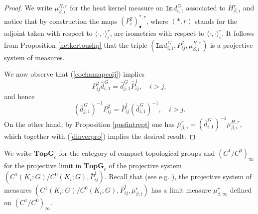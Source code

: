 \documentclass[11pt,reqno]{amsart}
\numberwithin{equation}{section}
\theoremstyle{remark}
\theoremstyle{rmdefinition}
\begin{document}
\begin{proof}
We write $\mu^{H,r}_{\beta,i}$ for the heat kernel measure on $\mathtt{Im}\hspace{1pt}d_{i,1}^{\hspace{1pt}G}$ associated to $H^r_{\beta,i}$ and notice that by construction the maps $(P^2_i)_{\bullet}^{*,r}$, where $(*,r)$ stands for the adjoint taken with respect to $\langle \cdot, \cdot \rangle_{i}^r$,  are isometries with respect to $\langle \cdot, \cdot \rangle_{i}^r$. It follows from Proposition \ref{hetkertoushp} that the triple $(\mathtt{Im}\hspace{1pt}d_{i,1}^{\hspace{1pt}G},P^2_{ij},\mu^{H,r}_{\beta,i})$ is a projective system of measures.

We now observe that (\ref{cochamapcoij}) implies
$$ P^{2}_{ij}\bar{d}^{\hspace{1pt}G}_{i,1} =\bar{d}^{\hspace{1pt}G}_{j,1} \hat{P}^1_{ij}, \quad i>j,$$
and hence
\begin{equation}\label{dinverpro}
(\bar{d}^{\hspace{1pt}G}_{j,1})^{-1}P^{2}_{ij}= \bar{P}^1_{ij} (\bar{d}^{\hspace{1pt}G}_{i,1})^{-1}, \quad i>j.
\end{equation}
On the other hand, by Proposition \ref{pusfintrept} one has $\bar{\mu}^r_{\beta,i}= (\bar{d}^{\hspace{1pt}G}_{i,1})^{-1}\mu^{H,r}_{\beta,i}$, which together with (\ref{dinverpro}) implies the desired result. 
\end{proof}

We write $\mathbf{TopG}_c$ for the category of compact topological groups and $(C^1/C^0)_\infty$ for the projective limit in $\mathbf{TopG}_c$  of the projective system \newline $(C^1(K_i;G)/C^0(K_i;G),\bar{P}^1_{ij})$. Recall that (see e.g. \cite[Part I, Chapter I, \S 10]{Sz}), the projective system of measures $(C^1(K_i;G)/C^0(K_i;G),\bar{P}^1_{ij},\bar{\mu}^r_{\beta,i})$ has a limit measure $\mu^r_{\beta,\infty}$ defined on $(C^1/C^0)_\infty$.
\end{document}
